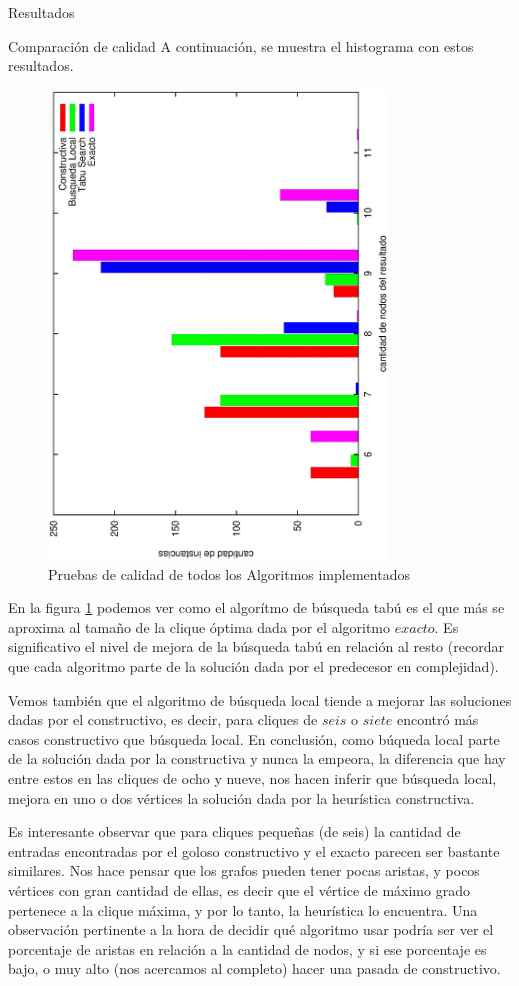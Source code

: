 \documentclass[12pt,titlepage]{article}
\begin{document}
\begin{section}{Resultados}
\begin{subsection}{Comparación de calidad}
		A continuación, se muestra el histograma con estos resultados.
		\begin{figure}[H]
			\centering
					\includegraphics[width=9cm,angle=-90]{conclusiones/calidad.eps}
			\caption{Pruebas de calidad de todos los Algoritmos implementados}
			\label{fig:Calidad de los Algoritmos}
		\end{figure}
		
		En la figura \ref{fig:Calidad de los Algoritmos} podemos ver como el algorítmo de búsqueda tabú es el que más se aproxima al tamaño de la clique óptima dada por el algoritmo $exacto$. Es significativo el nivel de mejora de la búsqueda tabú en relación al resto (recordar que cada algoritmo parte de la solución dada por el predecesor en complejidad).
		
		Vemos también que el algoritmo de búsqueda local tiende a mejorar las soluciones dadas por el constructivo, es decir, para cliques de $seis$ o $siete$ encontró más casos constructivo que búsqueda local. En conclusión, como búqueda local parte de la solución dada por la constructiva y nunca la empeora, la diferencia que hay entre estos en las cliques de ocho y nueve, nos hacen inferir que búsqueda local, mejora en uno o dos vértices la solución dada por la heurística constructiva.
		
		Es interesante observar que para cliques pequeñas (de seis) la cantidad de entradas encontradas por el goloso constructivo y el exacto parecen ser bastante similares. Nos hace pensar que los grafos pueden tener pocas aristas, y pocos vértices con gran cantidad de ellas, es decir que el vértice de máximo grado pertenece a la clique máxima, y por lo tanto, la heurística lo encuentra. Una observación pertinente a la hora de decidir qué algoritmo usar podría ser ver el porcentaje de aristas en relación a la cantidad de nodos, y si ese porcentaje es bajo, o muy alto (nos acercamos al completo) hacer una pasada de constructivo.
		\end{subsection}
	\end{section}
\end{document}
